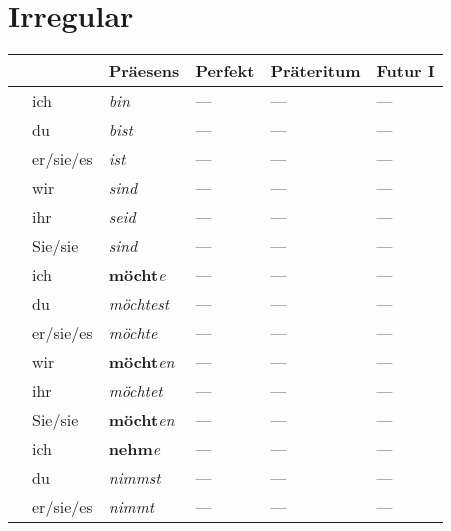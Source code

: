     \section{Irregular}\label{section:verben:irregular}
        
        \begin{longtabu}to 
            \toprule
            && \textbf{Präesens} & \textbf{Perfekt} & \textbf{Präteritum} & \textbf{Futur I}\\ \toprule \endhead
                & ich & \textit{bin} & --- & --- & ---\\ 
                & du & \textit{bist} & --- & --- & ---\\ 
                & er/sie/es & \textit{ist} & --- & --- & ---\\ 
                & wir & \textit{sind} & --- & --- & ---\\ 
                & ihr & \textit{seid} & --- & --- & ---\\ 
                & Sie/sie & \textit{sind} & --- & --- & ---\\ 
            \toprule
                 & ich & \textbf{möcht}\textit{e} & --- & --- & ---\\ 
                & du & \textit{möchtest} & --- & --- & ---\\ 
                & er/sie/es & \textit{möchte} & --- & --- & ---\\ 
                & wir & \textbf{möcht}\textit{en} & --- & --- & ---\\ 
                & ihr & \textit{möchtet} & --- & --- & ---\\ 
                & Sie/sie & \textbf{möcht}\textit{en} & --- & --- & ---\\ 
            \toprule
                 & ich & \textbf{nehm}\textit{e} & --- & --- & ---\\ 
                & du & \textit{nimmst} & --- & --- & ---\\ 
                & er/sie/es & \textit{nimmt} & --- & --- & ---\\ 

\end{longtabu}
